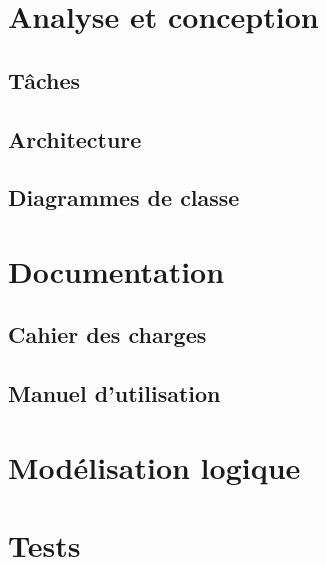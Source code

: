 \documentclass[11pt, letterpaper]{article}
\begin{document}
\section{Analyse et conception}

\subsection{Tâches}

\subsection{Architecture}

\subsection{Diagrammes de classe}

\section{Documentation}

\subsection{Cahier des charges}

\subsection{Manuel d'utilisation}

\section{Modélisation logique}

\section{Tests}
\end{document}
